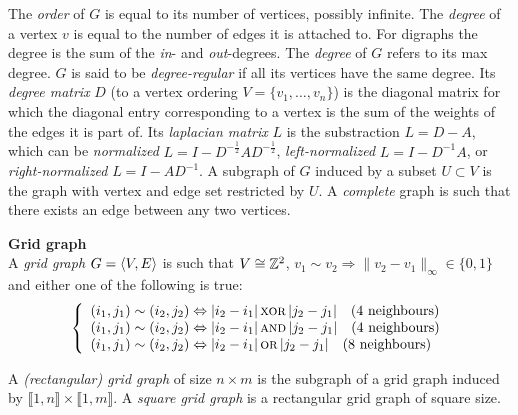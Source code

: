 The \emph{order} of $G$ is equal to its number of vertices, possibly infinite.
The \emph{degree} of a vertex $v$ is equal to the number of edges it is attached to.
For digraphs the degree is the sum of the \emph{in}- and \emph{out}-degrees.
The \emph{degree} of $G$ refers to its max degree.
$G$ is said to be \emph{degree-regular} if all its vertices have the same degree.
Its \emph{degree matrix} $D$ (\wrt to a vertex ordering $V = \{v_1, \ldots, v_n\}$) is the diagonal matrix for which the diagonal entry corresponding to a vertex is the sum of the weights of the edges it is part of.
Its \emph{laplacian matrix} $L$ is the substraction $L = D-A$, which can be \emph{normalized} $L = I - D^{-\frac{1}2}AD^{-\frac{1}2}$, \emph{left-normalized} $L = I - D^{-1}A$, or \emph{right-normalized} $L = I - AD^{-1}$.
A subgraph of $G$ induced by a subset $U \subset V$ is the graph with vertex and edge set restricted by $U$.
A \emph{complete} graph is such that there exists an edge between any two vertices.

\begin{definition}\textbf{Grid graph}\\
A \emph{grid graph} $G = \langle V, E \rangle$ is 
such that $V \cong \mathbb{Z}^2$, $v_1 \sim v_2 \Rightarrow \|v_2 -v_1\|_\infty \in \{0, 1\}$ and either one of the following is true:
\begin{gather*}
\left\{
  \begin{array}{l}
    (i_1,j_1) \sim (i_2,j_2) \Leftrightarrow |i_2 - i_1| \operatorname{\textsc{xor}} |j_2 - j_1| \quad \text{($4$ neighbours)}\\
    (i_1,j_1) \sim (i_2,j_2) \Leftrightarrow |i_2 - i_1| \operatorname{\textsc{and}} |j_2 - j_1| \quad \text{($4$ neighbours)}\\
    (i_1,j_1) \sim (i_2,j_2) \Leftrightarrow |i_2 - i_1| \operatorname{\textsc{or}} |j_2 - j_1| \quad \text{($8$ neighbours)}
  \end{array}
\right.
\end{gather*}

A \emph{(rectangular) grid graph} of size $n \times m$ is the subgraph of a grid graph induced by $\llbracket 1, n \rrbracket \times \llbracket 1, m \rrbracket$. A \emph{square grid graph} is a rectangular grid graph of square size.
\end{definition}


